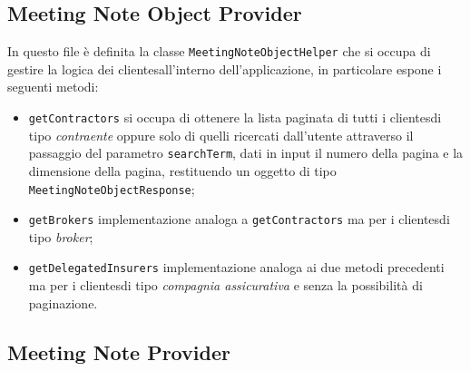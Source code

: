 \subsection{Meeting Note Object Provider}
\label{subsec:meeting-note-object-provider}

In questo file è definita la classe \lstinline{MeetingNoteObjectHelper} che si occupa di gestire la logica dei \glspl{cliente}\glsoccur all'interno dell'applicazione, in particolare espone i seguenti metodi:
\begin{itemize}
    \item \lstinline{getContractors} si occupa di ottenere la lista paginata di tutti i \glspl{cliente}\glsoccur di tipo \emph{contraente} oppure solo di quelli ricercati dall'utente attraverso il passaggio del parametro \lstinline{searchTerm}, dati in input il numero della pagina e la dimensione della pagina, restituendo un oggetto di tipo \lstinline{MeetingNoteObjectResponse};
    \item \lstinline{getBrokers} implementazione analoga a \lstinline{getContractors} ma per i \glspl{cliente}\glsoccur di tipo \emph{broker};
    \item \lstinline{getDelegatedInsurers} implementazione analoga ai due metodi precedenti ma per i \glspl{cliente}\glsoccur di tipo \emph{compagnia assicurativa} e senza la possibilità di paginazione.
\end{itemize}

\subsection{Meeting Note Provider}
\label{subsec:meeting-note-provider}

